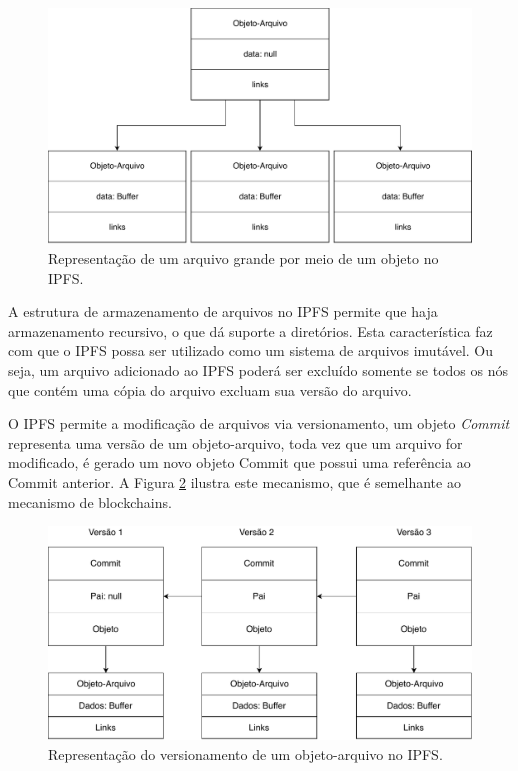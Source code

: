 \documentclass[tcc,capa]{texufpel}
\begin{document}
    \begin{figure}[h!]
        \centering
        \includegraphics[width=15cm]{imagens/representacao-arquivo-grande-ipfs.pdf}
        \caption{Representação de um arquivo grande por meio de um objeto no IPFS.}
        \label{fig:representacao-arquivo-grande-ipfs}
    \end{figure}
    
    A estrutura de armazenamento de arquivos no IPFS permite que haja armazenamento recursivo, o que dá suporte a diretórios. Esta característica faz com que o IPFS possa ser utilizado como um sistema de arquivos imutável. Ou seja, um arquivo adicionado ao IPFS poderá ser excluído somente se todos os nós que contém uma cópia do arquivo excluam sua versão do arquivo.
    
    O IPFS permite a modificação de arquivos via versionamento, um objeto \textit{Commit} representa uma versão de um objeto-arquivo, toda vez que um arquivo for modificado, é gerado um novo objeto Commit que possui uma referência ao Commit anterior. A Figura \ref{fig:representacao-commit-ipfs} ilustra este mecanismo, que é semelhante ao mecanismo de blockchains.
    
    \begin{figure}[h]
        \centering
        \includegraphics[width=16cm]{imagens/representacao-commit-ipfs.pdf}
        \caption{Representação do versionamento de um objeto-arquivo no IPFS.}
        \label{fig:representacao-commit-ipfs}
    \end{figure}
    
\end{document}
